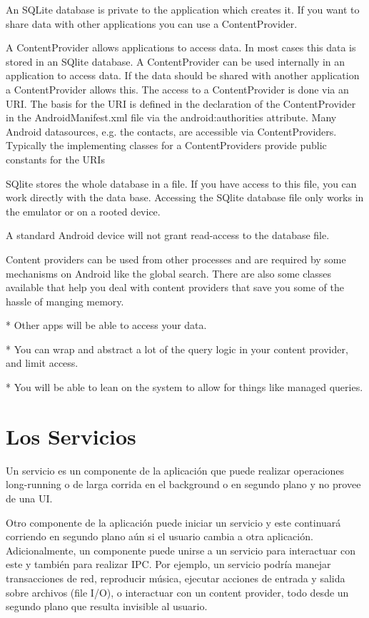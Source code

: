 An SQLite database is private to the application which creates it. If you want to share data with other applications you can use a ContentProvider.

A ContentProvider allows applications to access data. In most cases this data is stored in an SQlite database.
A ContentProvider can be used internally in an application to access data. If the data should be shared with another application a ContentProvider allows this.
The access to a ContentProvider is done via an URI. The basis for the URI is defined in the declaration of the ContentProvider in the AndroidManifest.xml file via the android:authorities attribute.
Many Android datasources, e.g. the contacts, are accessible via ContentProviders. Typically the implementing classes for a ContentProviders provide public constants for the URIs

SQlite stores the whole database in a file. If you have access to this file, you can work directly with the data base. Accessing the SQlite database file only works in the emulator or on a rooted device.

A standard Android device will not grant read-access to the database file.

Content providers can be used from other processes and are required by some mechanisms on Android like the global search. There are also some classes available that help you deal with content providers that save you some of the hassle of manging memory.

   * Other apps will be able to access your data.

   * You can wrap and abstract a lot of the query logic in your content provider, and limit access.

   * You will be able to lean on the system to allow for things like managed queries.

\section{Los Servicios}
\label{sec:services}

Un servicio es un componente de la aplicaci\'on que puede realizar operaciones long-running o de larga corrida en el background o en segundo plano y no provee de una \ac{UI}.

Otro componente de la aplicaci\'on puede iniciar un servicio y este continuar\'a corriendo en segundo plano a\'un si el usuario cambia a otra aplicaci\'on. Adicionalmente, un componente puede unirse a un servicio para interactuar con este y tambi\'en para realizar \ac{IPC}. Por ejemplo, un servicio podr\'ia manejar transacciones de red, reproducir m\'usica, ejecutar acciones de entrada y salida sobre archivos (file I/O), o interactuar con un content provider, todo desde un segundo plano que resulta invisible al usuario.


